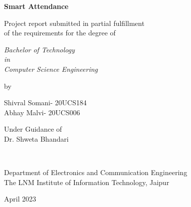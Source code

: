 \thispagestyle{empty}
\begin{center}
{\Large \bf Smart Attendance }


\vspace*{1.75cm}
{\large Project report submitted in partial fulfillment\\}
{\large  of the requirements for the degree of \\}

\vspace*{1cm}
{\it {\large Bachelor of Technology} \\
{\large in\\}
{\large Computer Science Engineering \\}}

\vspace*{1cm}
{\large by}

\vspace*{1cm}
{\large Shivral Somani- 20UCS184\\}
{\large Abhay Malvi- 20UCS006 \\}


\vspace*{5mm}
{\large Under Guidance of \\}
{\large Dr. Shweta Bhandari  \\}

\vspace*{1.0cm}
{\\}

\vspace*{2.0cm}
{\large Department of Electronics and Communication Engineering \\}
{\large The LNM Institute of Information Technology, Jaipur\\}

\vspace*{1.0cm}
{\large April 2023\\}
\end{center}

\clearpage
